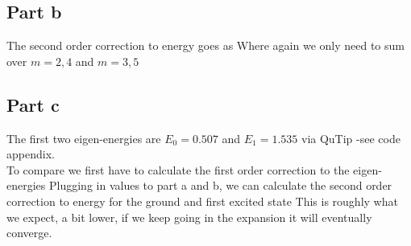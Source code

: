 \subsection*{Part b}
The second order correction to energy goes as
Where again we only need to sum over $m=2,4$ and $m=3,5$

\subsection*{Part c}
The first two eigen-energies are $E_0 = 0.507$ and $E_1 = 1.535$ via QuTip -see code appendix.\\

To compare we first have to calculate the first order correction to the eigen-energies
Plugging in values to part a and b, we can calculate the second order correction to energy for the ground and first excited state
This is roughly what we expect, a bit lower, if we keep going in the expansion it will eventually converge.
\newpage
